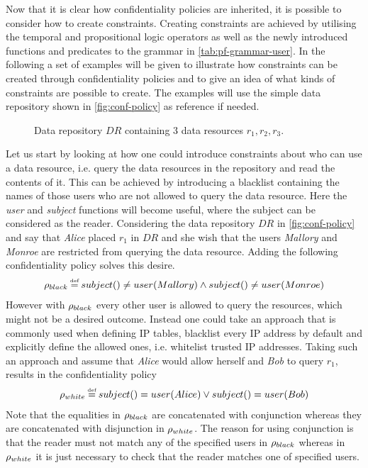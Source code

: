 Now that it is clear how confidentiality policies are inherited, it is possible to consider how to create constraints. Creating constraints are achieved by utilising the temporal and propositional logic operators as well as the newly introduced functions and predicates to the grammar in \autoref{tab:pf-grammar-user}. In the following a set of examples will be given to illustrate how constraints can be created through confidentiality policies and to give an idea of what kinds of constraints are possible to create. The examples will use the simple data repository shown in \autoref{fig:conf-policy} as reference if needed.

\begin{figure}[!ht]
    \begin{center}
        
        \caption{Data repository $DR$ containing 3 data resources $r_1, r_2, r_3$.}
        \label{fig:conf-policy}
    \end{center}
\end{figure}

\begin{example}\label{ex:conf-reader-constraints}
Let us start by looking at how one could introduce constraints about who can use a data resource, i.e. query the data resources in the repository and read the contents of it. This can be achieved by introducing a blacklist containing the names of those users who are not allowed to query the data resource. Here the \emph{user} and \emph{subject} functions will become useful, where the subject can be considered as the reader. Considering the data repository $DR$ in \autoref{fig:conf-policy} and say that \emph{Alice} placed $r_1$ in $DR$ and she wish that the users \emph{Mallory} and \emph{Monroe} are restricted from querying the data resource. Adding the following confidentiality policy solves this desire.
\begin{align*}
    \conf_{black} \eqdef subject() \neq user(Mallory) \land subject() \neq user(Monroe)
\end{align*}
However with $\rho_{black}$ every other user is allowed to query the resources, which might not be a desired outcome. Instead one could take an approach that is commonly used when defining IP tables, blacklist every IP address by default and explicitly define the allowed ones, i.e. whitelist trusted IP addresses. Taking such an approach and assume that \emph{Alice} would allow herself and \emph{Bob} to query $r_1$, results in the confidentiality policy
\begin{align*}
    \conf_{white} \eqdef subject() = user(Alice) \lor subject() = user(Bob)
\end{align*}
Note that the equalities in $\rho_{black}$ are concatenated with conjunction whereas they are concatenated with disjunction in $\rho_{white}$. The reason for using conjunction is that the reader must not match any of the specified users in $\rho_{black}$ whereas in $\rho_{white}$ it is just necessary to check that the reader matches one of specified users.
\end{example}

